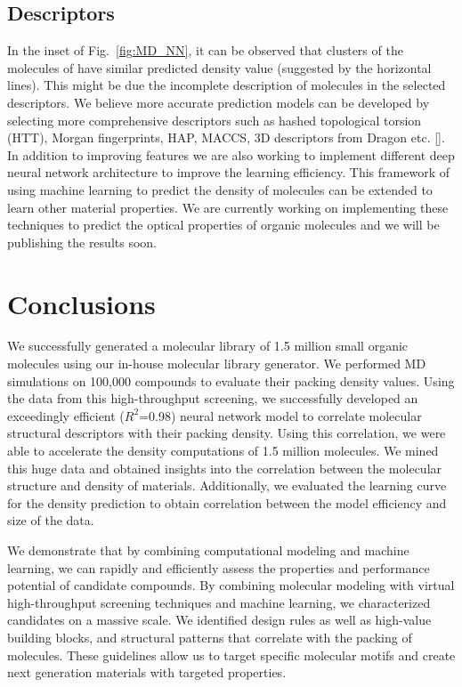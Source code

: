 \subsection{Descriptors}
\label{subsec:descriptors}

In the inset of Fig.\ \ref{fig:MD_NN}, it can be observed that clusters of the molecules of have similar predicted density value (suggested by the horizontal lines). This might be due the incomplete description of molecules in the selected descriptors. We believe more accurate prediction models can be developed by selecting more comprehensive descriptors such as hashed topological torsion (HTT), Morgan fingerprints, HAP, MACCS, 3D descriptors from Dragon etc. []. In addition to improving features we are also working to implement different deep neural network architecture to improve the learning efficiency. This framework of using machine learning to predict the density of molecules can be extended to learn other material properties. We are currently working on implementing these techniques to predict the optical properties of organic molecules and we will be publishing the results soon.

\section{Conclusions}
\label{sec:conclusions} 

We successfully generated a molecular library of 1.5 million small organic molecules using our in-house molecular library generator. We performed MD simulations on 100,000 compounds to evaluate their packing density values. Using the data from this high-throughput screening, we successfully developed an exceedingly efficient ($R^2$=0.98) neural network model to correlate molecular structural descriptors with their packing density. Using this correlation, we were able to accelerate the density computations of 1.5 million molecules. We mined this huge data and obtained insights into the correlation between the molecular structure and density of materials. Additionally, we evaluated the learning curve for the density prediction to obtain correlation between the model efficiency and size of the data.

We demonstrate that by combining computational modeling and machine learning, we can rapidly and efficiently assess the properties and performance potential of candidate compounds. By combining molecular modeling with virtual high-throughput screening techniques and machine learning, we characterized candidates on a massive scale. We identified design rules as well as high-value building blocks, and structural patterns that correlate with the packing of molecules. These guidelines allow us to target specific molecular motifs and create next generation materials with targeted properties.

